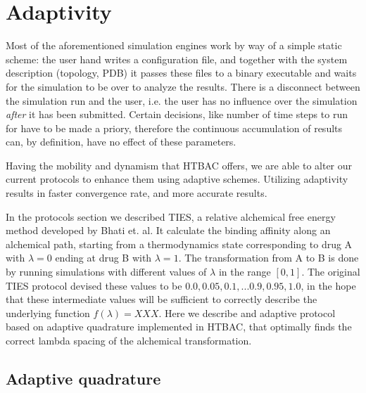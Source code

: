 \section{Adaptivity}

Most of the aforementioned simulation engines work by way of a simple static scheme: the user hand writes a configuration file, and together with the system description (topology, PDB) it passes these files to a binary executable and waits for the simulation to be over to analyze the results. There is a disconnect between the simulation run and the user, i.e. the user has no influence over the simulation \emph{after} it has been submitted. Certain decisions, like number of time steps to run for have to be made a priory, therefore the continuous accumulation of results can, by definition, have no effect of these parameters.


Having the mobility and dynamism that HTBAC offers, we are able to alter our current protocols to enhance them using adaptive schemes. Utilizing adaptivity results in faster convergence rate, and more accurate results.

In the protocols section we described TIES, a relative alchemical free energy method developed by Bhati et. al. It calculate the binding affinity along an alchemical path, starting from a thermodynamics state corresponding to drug A with $\lambda=0$ ending at drug B with $\lambda=1$. The transformation from A to B is done by running simulations with different values of $\lambda$ in  the range $[0, 1]$. The original TIES protocol devised these values to be $0.0, 0.05, 0.1, ... 0.9, 0.95, 1.0$, in the hope that these intermediate values will be sufficient to correctly describe the underlying function $f(\lambda)=XXX$. Here we describe and adaptive protocol based on adaptive quadrature implemented in HTBAC, that optimally finds the correct lambda spacing of the alchemical transformation.

\subsection{Adaptive quadrature}

